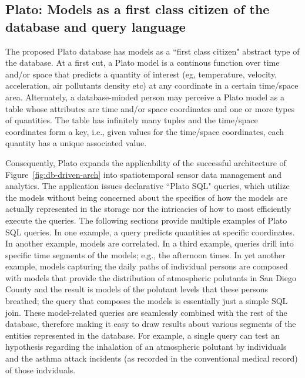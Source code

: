 \subsection{Plato: Models as a first class citizen of the database and query language}
\label{sec:plato}
The proposed Plato database has models as a ``first class citizen" abstract type of the database. At a first cut, a Plato model is a continous function over time and/or space that predicts a quantity of interest (eg, temperature, velocity, acceleration, air pollutants density etc) at any coordinate in a certain time/space area. Alternately, a database-minded person may perceive a Plato model as a table whose attributes are time and/or space coordinates and one or more types of quantities. The table has infinitely many tuples and the time/space coordinates form a key, i.e.,  given values for the time/space coordinates, each quantity has a unique associated value. 


Consequently, Plato expands the applicability of the successful architecture of Figure~\ref{fig:db-driven-arch} into spatiotemporal sensor data management and analytics. The application issues declarative ``Plato SQL" queries, which utilize the models without being concerned about the specifics of how the models are actually represented in the storage nor the intricacies of how to most efficiently execute the queries. The following sections provide multiple examples of Plato SQL queries. In one example, a query predicts quantities at specific coordinates. In another example, models are correlated. In a third example, queries drill into specific time segments of the models; e,g., the afternoon times. In yet another example, models capturing the daily paths of individual persons are composed with models that provide the distribution of atmospheric polutants in San Diego County and the result is models of the polutant levels that these persons breathed; the query that composes the models is essentially just a simple SQL join. These model-related queries are seamlessly combined with the rest of the database, therefore making it easy to draw results about various segments of the entities represented in the database. For example, a single query can test an hypothesis regarding the inhalation of an atmospheric polutant by individuals and the asthma attack incidents (as recorded in the conventional medical record) of those indviduals.


